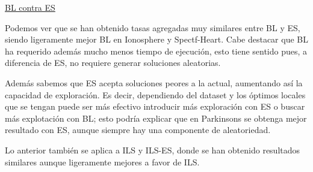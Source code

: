 \documentclass[11pt,a4paper]{article}
\theoremstyle{definition}
\begin{document}
	\underline{BL contra ES}
	
	Podemos ver que se han obtenido tasas agregadas muy similares entre BL y ES, siendo ligeramente mejor BL en Ionosphere y Spectf-Heart. Cabe destacar que BL ha requerido además mucho menos tiempo de ejecución, esto tiene sentido pues, a diferencia de ES, no requiere generar soluciones aleatorias.
	
	Además sabemos que ES acepta soluciones peores a la actual, aumentando así la capacidad de exploración. Es decir, dependiendo del dataset y los óptimos locales que se tengan puede ser más efectivo introducir más exploración con ES o buscar más explotación con BL; esto podría explicar que en Parkinsons se obtenga mejor resultado con ES, aunque siempre hay una componente de aleatoriedad.
	
	Lo anterior también se aplica a ILS y ILS-ES, donde se han obtenido resultados similares aunque ligeramente mejores a favor de ILS.

\end{document}
